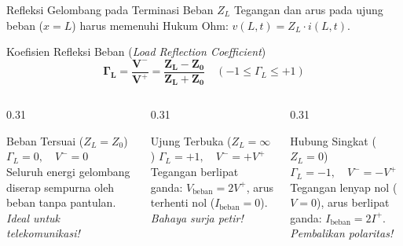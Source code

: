 \documentclass[aspectratio=169,10pt]{beamer}
\begin{document}
\begin{frame}{Refleksi Gelombang pada Terminasi Beban $Z_L$}
  Tegangan dan arus pada ujung beban ($x = L$) harus memenuhi Hukum Ohm: $v(L, t) = Z_L \cdot i(L, t)$.
  \begin{alertblock}{Koefisien Refleksi Beban (\textit{Load Reflection Coefficient})}
    \begin{equation*}
      \mathbf{\Gamma_L = \frac{V^-}{V^+} = \frac{Z_L - Z_0}{Z_L + Z_0}} \quad (-1 \le \Gamma_L \le +1)
    \end{equation*}
  \end{alertblock}
  \begin{columns}[t]
    \begin{column}{0.31\textwidth}
      \begin{block}{Beban Tersuai ($Z_L = Z_0$)}
        \small
        $\Gamma_L = 0, \quad V^- = 0$\\
        Seluruh energi gelombang diserap sempurna oleh beban tanpa pantulan.\\
        \textit{Ideal untuk telekomunikasi!}
      \end{block}
    \end{column}
    \begin{column}{0.31\textwidth}
      \begin{exampleblock}{Ujung Terbuka ($Z_L = \infty$)}
        \small
        $\Gamma_L = +1, \quad V^- = +V^+$\\
        Tegangan berlipat ganda: $V_{\text{beban}} = 2 V^+$, arus terhenti nol ($I_{\text{beban}} = 0$).\\
        \textit{Bahaya surja petir!}
      \end{exampleblock}
    \end{column}
    \begin{column}{0.31\textwidth}
      \begin{alertblock}{Hubung Singkat ($Z_L = 0$)}
        \small
        $\Gamma_L = -1, \quad V^- = -V^+$\\
        Tegangan lenyap nol ($V = 0$), arus berlipat ganda: $I_{\text{beban}} = 2 I^+$.\\
        \textit{Pembalikan polaritas!}
      \end{alertblock}
    \end{column}
  \end{columns}
\end{frame}
\end{document}
